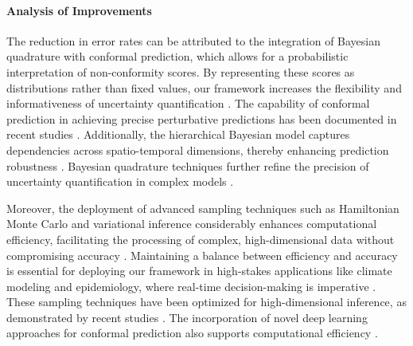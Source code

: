 \documentclass{article} %
\begin{document}
\begin{table}[h]
 \centering
 \caption{Conformal Prediction Error Rates across different experimental runs.}
 \label{tab:results}
\end{table}


\paragraph{Analysis of Improvements} 
The reduction in error rates can be attributed to the integration of Bayesian quadrature with conformal prediction, which allows for a probabilistic interpretation of non-conformity scores. By representing these scores as distributions rather than fixed values, our framework increases the flexibility and informativeness of uncertainty quantification \cite{nonintrusive2022,precise2022,carboncp2024}. The capability of conformal prediction in achieving precise perturbative predictions has been documented in recent studies \cite{how2022,precise2022}. Additionally, the hierarchical Bayesian model captures dependencies across spatio-temporal dimensions, thereby enhancing prediction robustness \cite{predictions2022,probabilistic2018,surrogate2024}. Bayesian quadrature techniques further refine the precision of uncertainty quantification in complex models \cite{bayesian2022,new2014,error2025}.

Moreover, the deployment of advanced sampling techniques such as Hamiltonian Monte Carlo and variational inference considerably enhances computational efficiency, facilitating the processing of complex, high-dimensional data without compromising accuracy \cite{stochastic2018,thermostatassisted2017}. Maintaining a balance between efficiency and accuracy is essential for deploying our framework in high-stakes applications like climate modeling and epidemiology, where real-time decision-making is imperative \cite{spatiotemporal2024,robust2016,detecting2024}. These sampling techniques have been optimized for high-dimensional inference, as demonstrated by recent studies \cite{accelerating2025}. The incorporation of novel deep learning approaches for conformal prediction also supports computational efficiency \cite{a2022,cadapter2024}.
\end{document}
